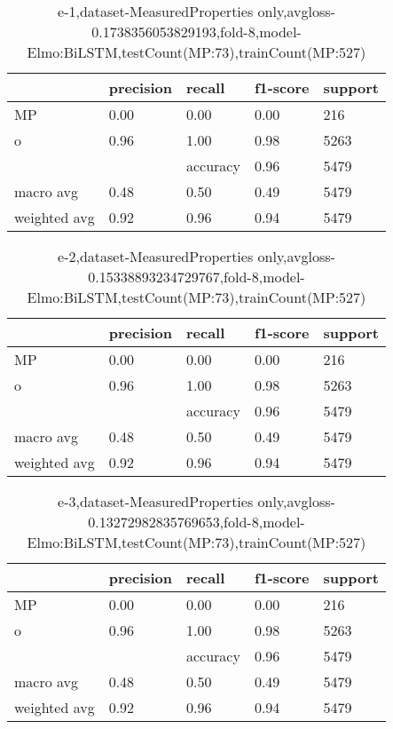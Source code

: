 \begin{table}[!ht] 
\centering
\caption{e-1,dataset-MeasuredProperties only,avgloss-0.1738356053829193,fold-8,model-Elmo:BiLSTM,testCount(MP:73),trainCount(MP:527)}\label{e-1data-mpS.tsv}
\begin{tabularx}{300pt}{|X|X|X|X|X|}
\hline
&precision&recall&f1-score&support\\
\hline
MP&0.00&0.00&0.00&216\\
\hline
o&0.96&1.00&0.98&5263\\
\hline
&&accuracy&0.96&5479\\
\hline
macro avg&0.48&0.50&0.49&5479\\
\hline
weighted avg&0.92&0.96&0.94&5479\\
\hline
\end{tabularx}
\end{table}
\begin{table}[!ht] 
\centering
\caption{e-2,dataset-MeasuredProperties only,avgloss-0.15338893234729767,fold-8,model-Elmo:BiLSTM,testCount(MP:73),trainCount(MP:527)}\label{e-2data-mpS.tsv}
\begin{tabularx}{300pt}{|X|X|X|X|X|}
\hline
&precision&recall&f1-score&support\\
\hline
MP&0.00&0.00&0.00&216\\
\hline
o&0.96&1.00&0.98&5263\\
\hline
&&accuracy&0.96&5479\\
\hline
macro avg&0.48&0.50&0.49&5479\\
\hline
weighted avg&0.92&0.96&0.94&5479\\
\hline
\end{tabularx}
\end{table}
\begin{table}[!ht] 
\centering
\caption{e-3,dataset-MeasuredProperties only,avgloss-0.13272982835769653,fold-8,model-Elmo:BiLSTM,testCount(MP:73),trainCount(MP:527)}\label{e-3data-mpS.tsv}
\begin{tabularx}{300pt}{|X|X|X|X|X|}
\hline
&precision&recall&f1-score&support\\
\hline
MP&0.00&0.00&0.00&216\\
\hline
o&0.96&1.00&0.98&5263\\
\hline
&&accuracy&0.96&5479\\
\hline
macro avg&0.48&0.50&0.49&5479\\
\hline
weighted avg&0.92&0.96&0.94&5479\\
\hline
\end{tabularx}
\end{table}
